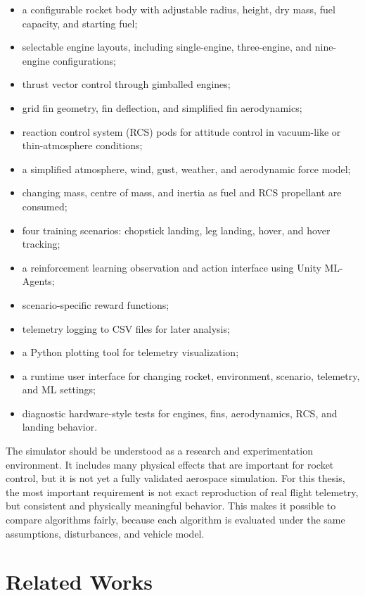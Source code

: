 \documentclass{article}
\begin{document}
\begin{itemize}
    \item a configurable rocket body with adjustable radius, height, dry mass, fuel capacity, and starting fuel;
    \item selectable engine layouts, including single-engine, three-engine, and nine-engine configurations;
    \item thrust vector control through gimballed engines;
    \item grid fin geometry, fin deflection, and simplified fin aerodynamics;
    \item reaction control system (RCS) pods for attitude control in vacuum-like or thin-atmosphere conditions;
    \item a simplified atmosphere, wind, gust, weather, and aerodynamic force model;
    \item changing mass, centre of mass, and inertia as fuel and RCS propellant are consumed;
    \item four training scenarios: chopstick landing, leg landing, hover, and hover tracking;
    \item a reinforcement learning observation and action interface using Unity ML-Agents;
    \item scenario-specific reward functions;
    \item telemetry logging to CSV files for later analysis;
    \item a Python plotting tool for telemetry visualization;
    \item a runtime user interface for changing rocket, environment, scenario, telemetry, and ML settings;
    \item diagnostic hardware-style tests for engines, fins, aerodynamics, RCS, and landing behavior.
\end{itemize}

The simulator should be understood as a research and experimentation environment. It includes many physical effects that are important for rocket control, but it is not yet a fully validated aerospace simulation. For this thesis, the most important requirement is not exact reproduction of real flight telemetry, but consistent and physically meaningful behavior. This makes it possible to compare algorithms fairly, because each algorithm is evaluated under the same assumptions, disturbances, and vehicle model.

\section{Related Works}
\end{document}
